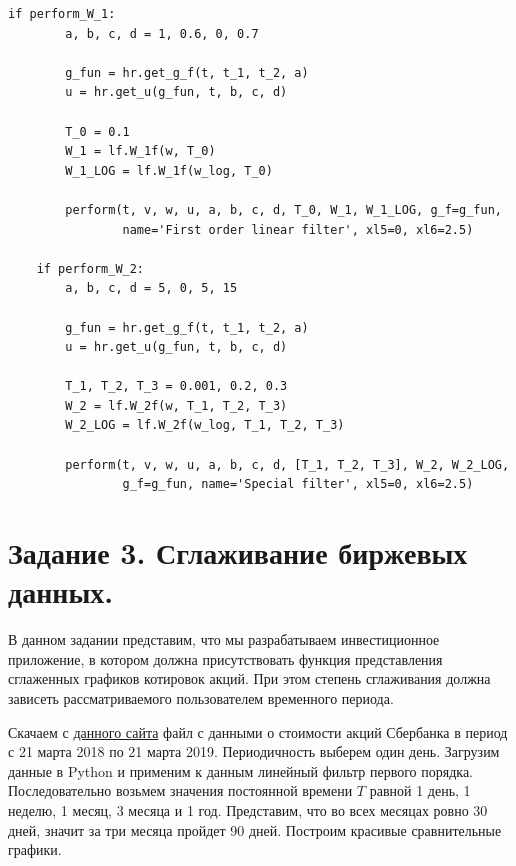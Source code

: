 \documentclass[a4paper, 12pt]{article}
\begin{document}
\begin{lstlisting}[label=l2, caption={Алгоритм, использующий приведенные ранее программы.}]
    if perform_W_1:
        a, b, c, d = 1, 0.6, 0, 0.7

        g_fun = hr.get_g_f(t, t_1, t_2, a)
        u = hr.get_u(g_fun, t, b, c, d)

        T_0 = 0.1
        W_1 = lf.W_1f(w, T_0)
        W_1_LOG = lf.W_1f(w_log, T_0)

        perform(t, v, w, u, a, b, c, d, T_0, W_1, W_1_LOG, g_f=g_fun, 
                name='First order linear filter', xl5=0, xl6=2.5)

    if perform_W_2:
        a, b, c, d = 5, 0, 5, 15

        g_fun = hr.get_g_f(t, t_1, t_2, a)
        u = hr.get_u(g_fun, t, b, c, d)

        T_1, T_2, T_3 = 0.001, 0.2, 0.3
        W_2 = lf.W_2f(w, T_1, T_2, T_3)
        W_2_LOG = lf.W_2f(w_log, T_1, T_2, T_3)

        perform(t, v, w, u, a, b, c, d, [T_1, T_2, T_3], W_2, W_2_LOG,
                g_f=g_fun, name='Special filter', xl5=0, xl6=2.5)
    \end{lstlisting}

    
    \section{Задание 3. Сглаживание биржевых данных.}
    В данном задании представим, что мы разрабатываем инвестиционное приложение, в котором должна
    присутствовать функция представления сглаженных графиков котировок акций. При этом степень
    сглаживания должна зависеть рассматриваемого пользователем временного периода.


    Скачаем с \href{https://www.finam.ru/quote/moex/sber/export/}{данного сайта} файл с данными о
    стоимости акций Сбербанка в период с 21 марта 2018 по 21 марта 2019. Периодичность выберем один день.
    Загрузим данные в Python и применим к данным линейный фильтр первого порядка. Последовательно возьмем
    значения постоянной времени $T$ равной 1 день, 1 неделю, 1 месяц, 3 месяца и 1 год. Представим, что
    во всех месяцах ровно 30 дней, значит за три месяца пройдет 90 дней. Построим красивые сравнительные графики.
\end{document}
